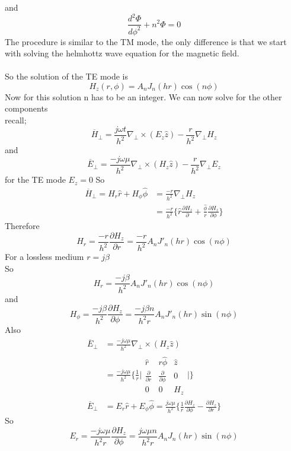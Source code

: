       and 
      \begin{equation}
      \dfrac{d^2\Phi}{d\phi^2} + n^2\Phi = 0
      \end{equation}
      The procedure is similar to the TM mode, the only difference is that we start with solving  the helmhottz wave equation for the magnetic field.\\\\
      So the solution of the TE mode is 
      $$ H_z(r,\phi) = A_nJ_n(hr)\cos(n\phi)$$
      Now for this solution n has to be an integer. We can now solve for the other components\\
      recall;
      $$ \overline{H}_\perp = \frac{j\omega t}{h^2}\nabla_\perp\times(E_z\hat{z}) - \frac{r}{h^2}\nabla_\perp H_z$$ and
      $$\overline{E}_\perp = \frac{-j\omega \mu}{h^2}\nabla_\perp\times(H_z\hat{z}) - \frac{r}{h^2}\nabla_\perp E_z$$
      for the TE mode $E_z = 0$ 
      So \begin{align} \overline{H}_\perp = H_r \hat{r} + H_\phi \hat{\phi} &= \frac{-r}{h^2}\nabla_\perp H_z\\
      &= \frac{-r}{h^2}\bigg\{\hat{r}\frac{\partial H_z}{\partial} + \frac{\hat{\phi}}{r} \frac{\partial H_z}{\partial \phi}   \bigg\}
      \end{align}
      Therefore
      $$H_r = \frac{-r}{h^2}\frac{\partial H_z}{\partial r} =  \frac{-r}{h^2}A_nJ'_n(hr)\cos(n\phi)$$
      For a lossless medium $ r =j\beta$\\
      So 
      $$H_r = \frac{-j\beta}{h^2}A_nJ'_n(hr)\cos(n\phi)$$
      and
      $$ H_\phi = \frac{-j\beta}{h^2}\frac{\partial H_z}{\partial \phi} =  \frac{-j\beta n}{h^2 r}A_nJ'_n(hr)\sin(n\phi)$$	 	
      Also
      \begin{align} \overline{E}_\perp &= \frac{-j\omega\mu}{h^2}\nabla_\perp\times(H_z\hat{z})\\
      &=\frac{-j\omega\mu}{h^2}\bigg\{ \frac{1}{r}\bigg|\begin{matrix}
      \hat{r} &  r\hat{\phi}  &  \hat{z}\\ \frac{\partial}{\partial r}  &  \frac{\partial}{\partial \phi}  &  0\\ 0  &  0  &  H_z
      \end{matrix}\bigg| \bigg\}\\
      \overline{E}_\perp &= E_r\hat{r} + E_\phi\hat{\phi} = \frac{j\omega\mu}{h^2} \bigg \{ \frac{1}{r}\frac{\partial H_z}{\partial \phi} - \frac{\partial H_z}{\partial r}\bigg\}
      \end{align}
      So 
      $$ E_r = \frac{-j\omega\mu}{h^2 r}\frac{\partial H_z}{\partial \phi} = \frac{j\omega\mu n}{h^2 r}A_nJ_n(hr)\sin(n\phi)$$

